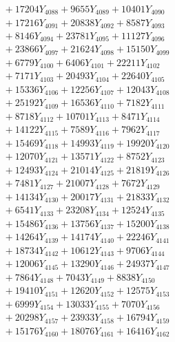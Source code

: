 \documentclass[a4paper,10pt]{article}
\begin{document}
{\begin{align}
&\;  + 17204 Y_{4088} + 9655 Y_{4089} + 10401 Y_{4090} \\[0.3ex]
&\;  + 17216 Y_{4091} + 20838 Y_{4092} + 8587 Y_{4093} \\[0.3ex]
&\;  + 8146 Y_{4094} + 23781 Y_{4095} + 11127 Y_{4096} \\[0.3ex]
&\;  + 23866 Y_{4097} + 21624 Y_{4098} + 15150 Y_{4099} \\[0.3ex]
&\;  + 6779 Y_{4100} + 6406 Y_{4101} + 22211 Y_{4102} \\[0.3ex]
&\;  + 7171 Y_{4103} + 20493 Y_{4104} + 22640 Y_{4105} \\[0.3ex]
&\;  + 15336 Y_{4106} + 12256 Y_{4107} + 12043 Y_{4108} \\[0.5ex]\allowbreak
&\;  + 25192 Y_{4109} + 16536 Y_{4110} + 7182 Y_{4111} \\[0.3ex]
&\;  + 8718 Y_{4112} + 10701 Y_{4113} + 8471 Y_{4114} \\[0.3ex]
&\;  + 14122 Y_{4115} + 7589 Y_{4116} + 7962 Y_{4117} \\[0.3ex]
&\;  + 15469 Y_{4118} + 14993 Y_{4119} + 19920 Y_{4120} \\[0.3ex]
&\;  + 12070 Y_{4121} + 13571 Y_{4122} + 8752 Y_{4123} \\[0.3ex]
&\;  + 12493 Y_{4124} + 21014 Y_{4125} + 21819 Y_{4126} \\[0.3ex]
&\;  + 7481 Y_{4127} + 21007 Y_{4128} + 7672 Y_{4129} \\[0.3ex]
&\;  + 14134 Y_{4130} + 20017 Y_{4131} + 21833 Y_{4132} \\[0.3ex]
&\;  + 6541 Y_{4133} + 23208 Y_{4134} + 12524 Y_{4135} \\[0.3ex]
&\;  + 15486 Y_{4136} + 13756 Y_{4137} + 15200 Y_{4138} \\[0.5ex]\allowbreak
&\;  + 14264 Y_{4139} + 14174 Y_{4140} + 22246 Y_{4141} \\[0.3ex]
&\;  + 18734 Y_{4142} + 10612 Y_{4143} + 9706 Y_{4144} \\[0.3ex]
&\;  + 12006 Y_{4145} + 13290 Y_{4146} + 24937 Y_{4147} \\[0.3ex]
&\;  + 7864 Y_{4148} + 7043 Y_{4149} + 8838 Y_{4150} \\[0.3ex]
&\;  + 19410 Y_{4151} + 12620 Y_{4152} + 12575 Y_{4153} \\[0.3ex]
&\;  + 6999 Y_{4154} + 13033 Y_{4155} + 7070 Y_{4156} \\[0.3ex]
&\;  + 20298 Y_{4157} + 23933 Y_{4158} + 16794 Y_{4159} \\[0.3ex]
&\;  + 15176 Y_{4160} + 18076 Y_{4161} + 16416 Y_{4162} \\[0.3ex]

\end{align}}
\end{document}
